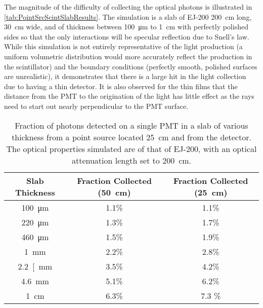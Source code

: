 The magnitude of the difficulty of collecting the optical photons is illustrated in \autoref{tab:PointSrcScintSlabResults}.
The simulation is a slab of EJ-200 \SI{200}{\cm} long, \SI{30}{\cm} wide, and of thickness between \SI{100}{\um} to \SI{1}{\cm} with perfectly polished sides so that the only interactions will be specular reflection due to Snell's law.
While this simulation is not entirely representative of the light production (a uniform volumetric distribution would more accurately reflect the production in the scintillator) and the boundary conditions (perfectly smooth, polished surfaces are unrealistic), it demonstrates that there is a large hit in the light collection due to having a thin detector.
It is also observed for the thin films that the distance from the PMT to the origination of the light has little effect as the rays need to start out nearly perpendicular to the PMT surface.
\begin{table}
	\caption[Fraction of Photons Detected from a Point Source on a single PMT]{Fraction of photons detected on a single PMT in a slab of various thickness from a point source located \SI{25}{\cm} and  from the detector.  The optical properties simulated are of that of EJ-200, with an optical attenuation length set to \SI{200}{\cm}.}
	\label{tab:PointSrcScintSlabResults}
	\begin{tabular}{c | c  c}
	\toprule
	Slab Thickness & Fraction Collected (\SI{50}{\cm}) & Fraction Collected (\SI{25}{\cm}) \\
	\midrule
	\SI{100}{\um} & 1.1\% & 1.1\% \\
	\SI{220}{\um} & 1.3\% & 1.7\% \\
	\SI{460}{\um} & 1.5\% & 1.9\% \\
	\SI{1}{\mm} & 2.2\% & 2.8\% \\
	\SI{2.2}[\mm} & 3.5\% & 4.2\% \\
	\SI{4.6}{\mm} & 5.1\% & 6.2\% \\
	\SI{1}{\cm} & 6.3\% & 7.3 \% \\
	\bottomrule
	\end{tabular}
\end{table}
